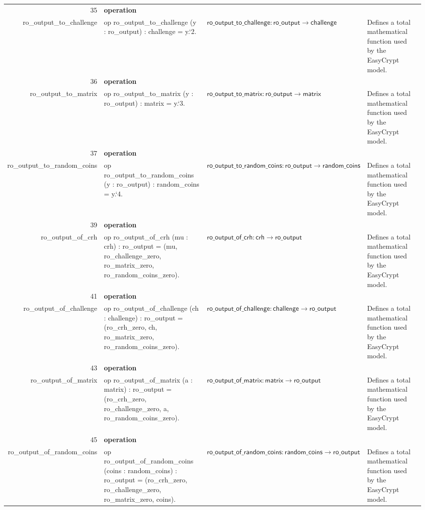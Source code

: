 \documentclass[10pt]{article}
\newcommand{\ec}[1]{\begingroup\ttfamily\scriptsize #1\endgroup}
\begin{document}
\begin{longtable}{r L{0.17\textwidth} L{0.26\textwidth} L{0.27\textwidth} L{0.20\textwidth}}
35 & \textbf{operation}\\\ec{ro\_output\_to\_challenge} & \ec{op ro\_output\_to\_challenge (y : ro\_output) : challenge = y.`2.} & \(\mathsf{ro\_output\_to\_challenge} : \mathsf{ro\_output} \to \mathsf{challenge}\) & Defines a total mathematical function used by the EasyCrypt model. \\
36 & \textbf{operation}\\\ec{ro\_output\_to\_matrix} & \ec{op ro\_output\_to\_matrix (y : ro\_output) : matrix = y.`3.} & \(\mathsf{ro\_output\_to\_matrix} : \mathsf{ro\_output} \to \mathsf{matrix}\) & Defines a total mathematical function used by the EasyCrypt model. \\
37 & \textbf{operation}\\\ec{ro\_output\_to\_random\_coins} & \ec{op ro\_output\_to\_random\_coins (y : ro\_output) : random\_coins = y.`4.} & \(\mathsf{ro\_output\_to\_random\_coins} : \mathsf{ro\_output} \to \mathsf{random\_coins}\) & Defines a total mathematical function used by the EasyCrypt model. \\
39 & \textbf{operation}\\\ec{ro\_output\_of\_crh} & \ec{op ro\_output\_of\_crh (mu : crh) : ro\_output = (mu, ro\_challenge\_zero, ro\_matrix\_zero, ro\_random\_coins\_zero).} & \(\mathsf{ro\_output\_of\_crh} : \mathsf{crh} \to \mathsf{ro\_output}\) & Defines a total mathematical function used by the EasyCrypt model. \\
41 & \textbf{operation}\\\ec{ro\_output\_of\_challenge} & \ec{op ro\_output\_of\_challenge (ch : challenge) : ro\_output = (ro\_crh\_zero, ch, ro\_matrix\_zero, ro\_random\_coins\_zero).} & \(\mathsf{ro\_output\_of\_challenge} : \mathsf{challenge} \to \mathsf{ro\_output}\) & Defines a total mathematical function used by the EasyCrypt model. \\
43 & \textbf{operation}\\\ec{ro\_output\_of\_matrix} & \ec{op ro\_output\_of\_matrix (a : matrix) : ro\_output = (ro\_crh\_zero, ro\_challenge\_zero, a, ro\_random\_coins\_zero).} & \(\mathsf{ro\_output\_of\_matrix} : \mathsf{matrix} \to \mathsf{ro\_output}\) & Defines a total mathematical function used by the EasyCrypt model. \\
45 & \textbf{operation}\\\ec{ro\_output\_of\_random\_coins} & \ec{op ro\_output\_of\_random\_coins (coins : random\_coins) : ro\_output = (ro\_crh\_zero, ro\_challenge\_zero, ro\_matrix\_zero, coins).} & \(\mathsf{ro\_output\_of\_random\_coins} : \mathsf{random\_coins} \to \mathsf{ro\_output}\) & Defines a total mathematical function used by the EasyCrypt model. \\

\end{longtable}
\end{document}
